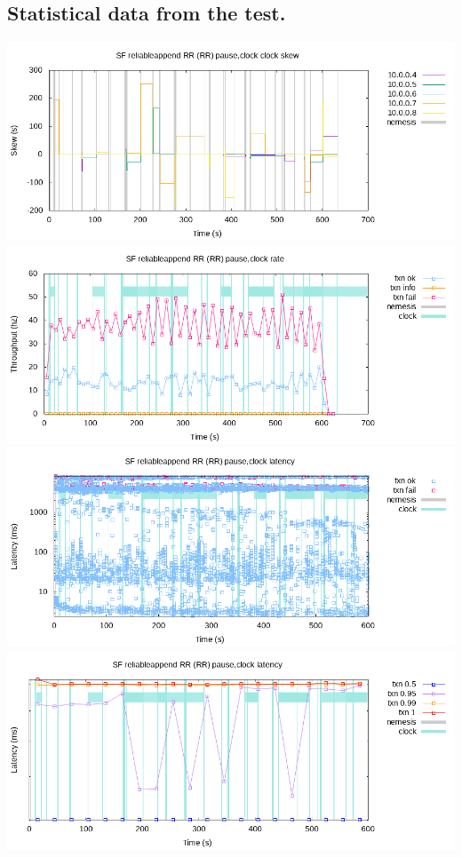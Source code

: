 \documentclass[a4paper,10pt,titlepage]{report}
\begin{document}
\subsection{Statistical data from the test.}
\includegraphics[scale=0.5]{results/clock-skew.png}
\\
\includegraphics[scale=0.5]{results/rate.png}
\\
\includegraphics[scale=0.5]{results/latency-raw.png}
\\
\includegraphics[scale=0.5]{results/latency-quantiles.png}
\end{document}
